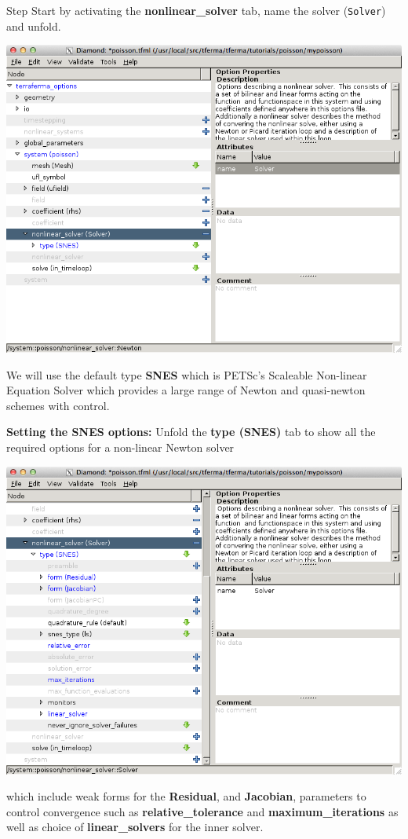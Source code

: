\begin{steps}{Step}
Start by activating the \textbf{nonlinear\_solver} tab, name the
solver (\texttt{Solver}) and unfold.
\begin{center}
    \includegraphics[width=\diamondwidth]{figures/screendumps/diamond_poisson_11a.png}
\end{center}
We will use the default type \textbf{SNES} which is PETSc's Scaleable
Non-linear Equation Solver which provides a large range of Newton and
quasi-newton schemes with control.
\item \textbf{Setting the SNES options:} Unfold the \textbf{type
    (SNES)} tab to show all the required options for a non-linear
 Newton  solver
\begin{center}
    \includegraphics[width=\diamondwidth]{figures/screendumps/diamond_poisson_11b.png}
\end{center}
which include weak forms for the \textbf{Residual}, and
\textbf{Jacobian}, parameters to control convergence such as
\textbf{relative\_tolerance} and \textbf{maximum\_iterations} as well
as choice of \textbf{linear\_solvers} for the inner solver.


\end{steps}
